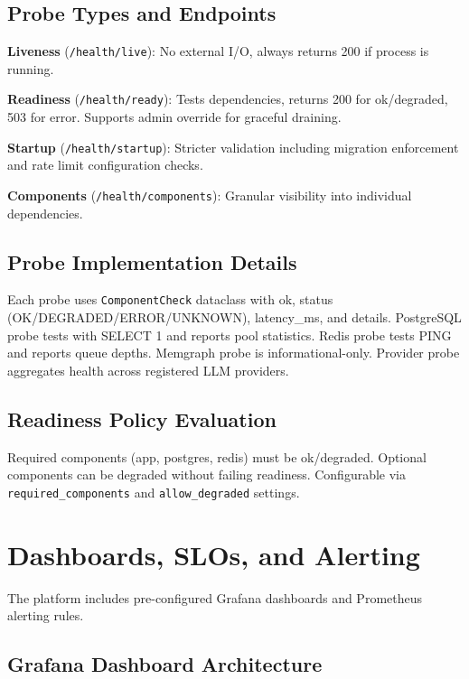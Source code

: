 \documentclass[a4paper,twoside]{sapthesis}
\begin{document}
\subsection{Probe Types and Endpoints}

\textbf{Liveness} (\texttt{/health/live}): No external I/O, always returns 200 if process is running.

\textbf{Readiness} (\texttt{/health/ready}): Tests dependencies, returns 200 for ok/degraded, 503 for error. Supports admin override for graceful draining.

\textbf{Startup} (\texttt{/health/startup}): Stricter validation including migration enforcement and rate limit configuration checks.

\textbf{Components} (\texttt{/health/components}): Granular visibility into individual dependencies.

\subsection{Probe Implementation Details}
\label{subsec:probe-implementation}

Each probe uses \texttt{ComponentCheck} dataclass with ok, status (OK/DEGRADED/ERROR/UNKNOWN), latency\_ms, and details. PostgreSQL probe tests with SELECT 1 and reports pool statistics. Redis probe tests PING and reports queue depths. Memgraph probe is informational-only. Provider probe aggregates health across registered LLM providers.

\subsection{Readiness Policy Evaluation}

Required components (app, postgres, redis) must be ok/degraded. Optional components can be degraded without failing readiness. Configurable via \texttt{required\_components} and \texttt{allow\_degraded} settings.

\section{Dashboards, SLOs, and Alerting}
\label{sec:dashboards-slos-alerting}

The platform includes pre-configured Grafana dashboards and Prometheus alerting rules.

\subsection{Grafana Dashboard Architecture}
\end{document}
